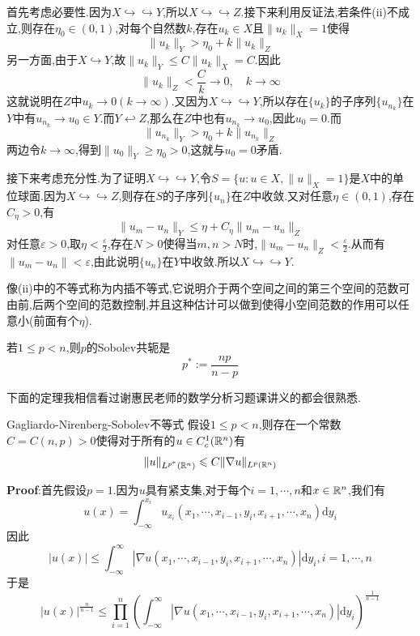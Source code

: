 \begin{Proof}
    首先考虑必要性.因为$X\hookrightarrow\hookrightarrow Y$,所以$X\hookrightarrow\hookrightarrow Z$.接下来利用反证法,若条件(ii)不成立,则存在$\eta_0\in (0,1)$,对每个自然数$k$,存在$u_k\in X$且$\|u_k\|_X=1$使得
    $$
    \|u_k\|_Y>\eta_0+k\|u_k\|_Z
    $$
    另一方面,由于$X\hookrightarrow Y$,故$\|u_k\|_Y\leqslant C\|u_k\|_X=C$.因此
    $$
    \|u_k\|_Z<\frac{C}{k}\to 0,\quad k\to\infty
    $$
    这就说明在$Z$中$u_k\to 0(k\to \infty)$.又因为$X\hookrightarrow\hookrightarrow Y$,所以存在$\{u_k\}$的子序列$\{u_{n_k}\}$在$Y$中有$u_{n_k}\to u_0\in Y$.而$Y\hookleftarrow Z$,那么在$Z$中也有$u_{n_k}\to u_0$,因此$u_0=0$.而
    $$
    \|u_{n_k}\|_Y>\eta_0+k\|u_{n_k}\|_Z
    $$
    两边令$k\to\infty$,得到$\|u_0\|_Y\geqslant \eta_0>0$,这就与$u_0=0$矛盾.\par
    接下来考虑充分性.为了证明$X\hookrightarrow\hookrightarrow Y$,令$S=\{u:u\in X,\|u\|_X=1\}$是$X$中的单位球面.因为$X\hookrightarrow\hookrightarrow Z$,则存在$S$的子序列$\{u_n\}$在$Z$中收敛.又对任意$\eta\in (0,1)$,存在$C_{\eta}>0$,有
    $$
    \|u_m-u_n\|_Y\leqslant \eta+C_{\eta}\|u_m-u_n\|_Z
    $$
    对任意$\varepsilon>0$,取$\eta<\frac{\varepsilon}{2}$,存在$N>0$使得当$m,n>N$时,$\|u_m-u_n\|_{Z}<\frac{\varepsilon}{2}$.从而有$\|u_m-u_n\|<\varepsilon$,由此说明$\{u_n\}$在$Y$中收敛.所以$X\hookrightarrow\hookrightarrow Y$.
\end{Proof}
像(ii)中的不等式称为内插不等式,它说明介于两个空间之间的第三个空间的范数可由前,后两个空间的范数控制,并且这种估计可以做到使得小空间范数的作用可以任意小(前面有个$\eta$).
\begin{Definition}{}
若$1\leqslant p<n$,则$p$的Sobolev共轭是
$$
p^*:=\frac{np}{n-p}
$$
\end{Definition}
下面的定理我相信看过谢惠民老师的数学分析习题课讲义的都会很熟悉.
\begin{Theorem}{Gagliardo-Nirenberg-Sobolev不等式}
    假设$1\leqslant p<n$,则存在一个常数$C=C(n,p)>0$使得对于所有的$u\in C^1_c(\mathbb{R} ^n)$有
   $$
    \|u\|_{L^{p^*}(\mathbb{R}^n)}\leqslant C\|\nabla u\|_{L^p(\mathbb{R}^n)}
   $$
\end{Theorem}
\textbf{Proof}:首先假设$p=1$.因为$u$具有紧支集,对于每个$i=1,\cdots,n$和$x\in \mathbb{R}^n$,我们有
$$
u(x)=\int_{-\infty}^{x_i}u_{x_i}(x_1,\cdots,x_{i-1},y_i,x_{i+1},\cdots,x_n)\mathrm{d}y_i
$$
因此
$$
|u(x)|\leqslant\int_{-\infty}^{\infty}|\nabla u(x_1,\cdots,x_{i-1},y_i,x_{i+1},\cdots,x_n)|\mathrm{d}y_i,i=1,\cdots,n
$$
于是
$$
|u(x)|^{\frac{n}{n-1}}\leqslant \prod _{i=1}^n\left(\int_{-\infty}^{\infty}|\nabla u(x_1,\cdots,x_{i-1},y_i,x_{i+1},\cdots,x_n)|\mathrm{d}y_i\right)^{\frac{1}{n-1}}
$$
